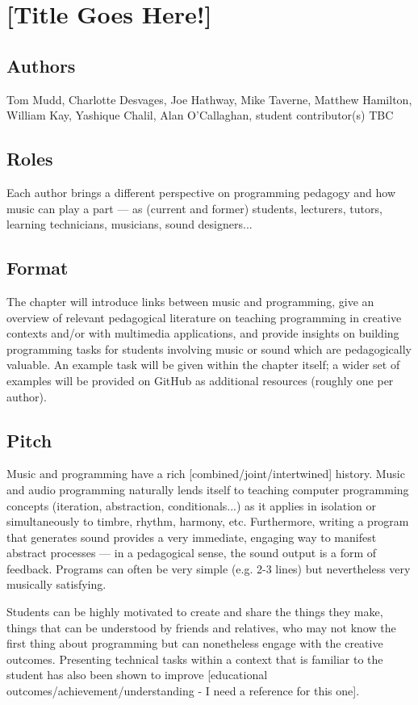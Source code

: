 \section*{[Title Goes Here!]}

\subsection*{Authors}
Tom Mudd, Charlotte Desvages, Joe Hathway, Mike Taverne, Matthew Hamilton, William Kay, Yashique Chalil, Alan O'Callaghan, student contributor(s) TBC

\subsection*{Roles}
Each author brings a different perspective on programming pedagogy and how music can play a part --- as (current and former) students, lecturers, tutors, learning technicians, musicians, sound designers...

\subsection*{Format}
The chapter will introduce links between music and programming, give an overview of relevant pedagogical literature on teaching programming in creative contexts and/or with multimedia applications, and provide insights on building programming tasks for students involving music or sound which are pedagogically valuable. An example task will be given within the chapter itself; a wider set of examples will be provided on GitHub as additional resources (roughly one per author).

\subsection*{Pitch}
Music and programming have a rich [combined/joint/intertwined] history. Music and audio programming naturally lends itself to teaching computer programming concepts (iteration, abstraction, conditionals...) as it applies in isolation or simultaneously to timbre, rhythm, harmony, etc. Furthermore, writing a program that generates sound provides a very immediate, engaging way to manifest abstract processes --- in a pedagogical sense, the sound output is a form of feedback. Programs can often be very simple (e.g. 2-3 lines) but nevertheless very musically satisfying. 

Students can be highly motivated to create and share the things they make, things that can be understood by friends and relatives, who may not know the first thing about programming but can nonetheless engage with the creative outcomes. Presenting technical tasks within a context that is familiar to the student has also been shown to improve [educational outcomes/achievement/understanding - I need a reference for this one].

